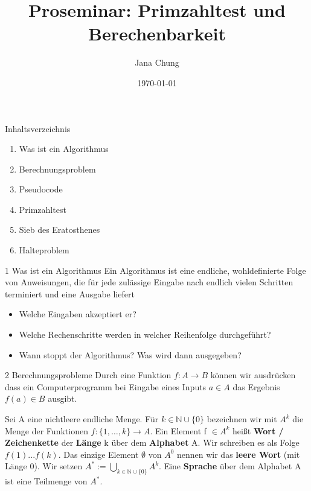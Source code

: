 \documentclass{beamer}
\title{Proseminar: Primzahltest und Berechenbarkeit}
\author{Jana Chung}
\date{\today}
\newcommand{\N}{\mathbb{N}}%
\begin{document}
\begin{frame}
    \titlepage
\end{frame}

\begin{frame}{Inhaltsverzeichnis}
    \begin{enumerate}
        \item Was ist ein Algorithmus
        \item Berechnungsproblem
        \item Pseudocode
        \item Primzahltest
       \item Sieb des Eratosthenes
        \item Halteproblem
        
    \end{enumerate}
\end{frame}

\begin{frame}{1 Was ist ein Algorithmus}
    Ein Algorithmus ist eine endliche, wohldefinierte Folge von Anweisungen, die für
jede zulässige Eingabe nach endlich vielen Schritten terminiert und eine Ausgabe
liefert 
    \begin{itemize}
        \item  Welche Eingaben akzeptiert er?
        \item  Welche Rechenschritte werden in welcher Reihenfolge durchgeführt?
        \item  Wann stoppt der Algorithmus? Was wird dann ausgegeben?
    \end{itemize}

\end{frame}

\begin{frame}{2 Berechnungsprobleme}
    Durch eine Funktion $f\colon A \to B$ können wir ausdrücken dass ein Computerprogramm bei Eingabe eines Inputs \(a \in A\) das Ergebnis \(f(a) \in B\) ausgibt.

\begin{definition}   
Sei A eine nichtleere endliche Menge. Für $k \in \N \cup \{0\}$ bezeichnen wir mit $A^k$ die Menge der Funktionen $f: \{1,\dots,k\} \rightarrow A$.
Ein Element f $\in A^k$ heißt \textbf{Wort / Zeichenkette} der \textbf{Länge} k über dem \textbf{Alphabet} A. Wir schreiben es als Folge $f(1)... f(k)$.  
Das einzige Element $\emptyset$ von $A^0$ nennen wir das \textbf{leere Wort} (mit Länge 0). Wir setzen $A^\ast:= \bigcup_{k\in \N \cup \{0\}}^{} A^k$.
Eine \textbf{Sprache} über dem Alphabet A ist eine Teilmenge von $A^\ast$.
\end{definition}

\end{frame}
\end{document}
